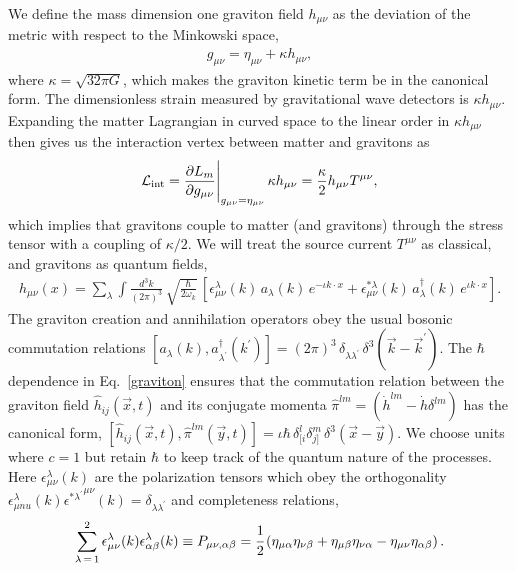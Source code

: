 \documentclass[aps,prd]{revtex4-2}
\begin{document}
\noindent We define the mass dimension one graviton field $h_{\mu \nu}$ as the deviation of the metric with respect to the Minkowski space, 
\begin{eqnarray}
g_{\mu \nu} = \eta_{\mu \nu} + \kappa h_{\mu \nu},
\end{eqnarray}
 where $\kappa = \sqrt{32\pi G}$, which makes the graviton kinetic term be in the canonical form. The dimensionless strain measured by gravitational wave detectors is $\kappa h_{\mu\nu}$. Expanding the matter Lagrangian in curved space to the linear order in $\kappa h_{\mu \nu}$ then gives us the interaction vertex between matter and gravitons as
\begin{eqnarray}
    {\mathcal L}_{\rm int} = \frac{\partial L_{m}}{\partial  g_{\mu \nu}}\Bigg\vert_{g_{\mu\nu} =\eta_{\mu\nu}}
\,\kappa h_{\mu \nu}= \frac{\kappa}{2}h_{\mu \nu}T^{\mu \nu},
\end{eqnarray}
which implies that gravitons couple to matter (and gravitons) through the stress tensor with a coupling of $\kappa/2$. We will treat the source current $T^{\mu\nu}$ as classical, and gravitons as quantum fields,
\begin{eqnarray}
\hat {h}_{\mu \nu}(x) = \sum_\lambda \int \frac{d^3 k}{(2 \pi)^3}\,\sqrt{\frac{\hbar}{2 \omega_k}}\, \left[\epsilon^\lambda_{\mu\nu}(k)\,a_\lambda(k)\,e^{-\iota k \cdot x} + \epsilon^{*\lambda}_{\mu \nu}(k)\, a^\dagger_\lambda(k)\,e^{\iota k \cdot x}  \right].
\label{graviton}
\end{eqnarray}
The graviton creation and annihilation operators obey the usual bosonic commutation relations $[a_\lambda(k),a^\dagger_{\lambda^\prime}(k^\prime)]=(2\pi)^3\,\delta_{\lambda \lambda^\prime}\,\delta^3(\vec k -\vec k^\prime)$. The $\hbar$ dependence in Eq.~\eqref{graviton} ensures that the commutation relation between the graviton field $\hat{h}_{ij}(\vec x,t)$ and its conjugate momenta $\hat{\pi}^{lm}=(\dot{h}^{lm}-\dot{h} \delta^{lm})$ has the canonical form, $[\hat h_{ij}(\vec x,t)
, \hat \pi^{lm}(\vec y,t)] = \iota\hbar\, \delta^l_{[i}\delta^m_{j]}\, \delta^3(\vec x-\vec y)$. We choose units where $c=1$ but retain $\hbar$ to keep track of the quantum nature of the processes.     
Here $\epsilon^\lambda_{\mu\nu}(k)$ are the polarization tensors which obey the orthogonality 
 $\epsilon^\lambda_{\mu  nu}(k) {\epsilon^{*\lambda^\prime}}^{\mu \nu}(k)= \delta_{\lambda \lambda^\prime}$
and completeness relations,
\begin{eqnarray}\label{comp}
    \sum^{2}_{\lambda\,=\,1} \epsilon^{\lambda}_{\mu\nu} (k) \epsilon^{\lambda}_{ \alpha\beta} (k) \equiv P_{\mu\nu, \alpha\beta} = \cfrac{1}{2} \left(\eta_{\mu \alpha} \eta_{\nu \beta} + \eta_{\mu \beta} \eta_{\nu \alpha} - \eta_{\mu \nu} \eta_{\alpha \beta}\right).
\end{eqnarray}
\end{document}
